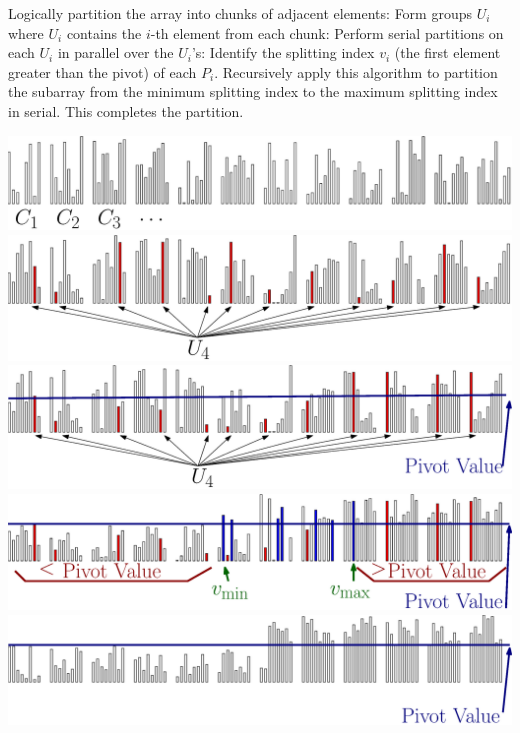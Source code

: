 \documentclass[xcolor=x11names, svgnames, rgb]{beamer}
\begin{document}
\begin{frame}[t]{}%
	\vspace{0.25cm}
	\begin{overprint}
	Logically partition the array into chunks of adjacent elements:
	\onslide<2>Form groups $U_i$ where $U_i$ contains the $i$-th element from each chunk:
	\onslide<3>Perform serial partitions on each $U_i$ in parallel over the $U_i$'s:
	\onslide<4>Identify the splitting index $v_i$ (the first element greater than the pivot) of each $P_i$. 
	\onslide<5>Recursively apply this algorithm to partition the subarray from the minimum splitting index to the maximum splitting index in serial. This completes the partition. 
	\end{overprint}
	\vspace{0.25cm}
	\begin{overprint}
	\includegraphics[width=\linewidth]{imgs/smoothedAlgSim1Ann.eps}
	\onslide<2>\includegraphics[width=\linewidth]{imgs/smoothedAlgSim2Ann.eps}
	\onslide<3>\includegraphics[width=\linewidth]{imgs/smoothedAlgSim3Ann.eps}
	\onslide<4>\includegraphics[width=\linewidth]{imgs/smoothedAlgSim4Ann.eps}
	\onslide<5>\includegraphics[width=\linewidth]{imgs/smoothedAlgSim5Ann.eps}

\end{overprint}
\end{frame}
\end{document}
